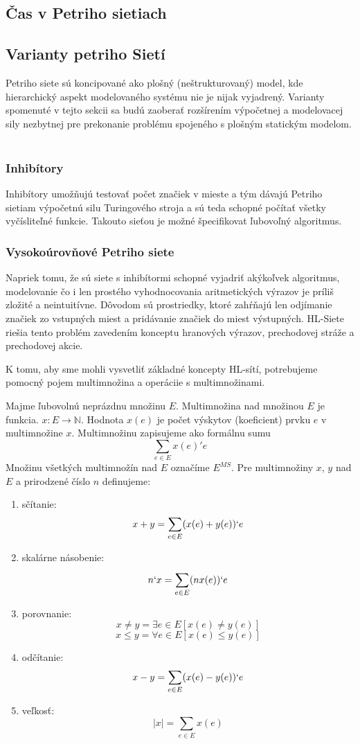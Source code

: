 \subsection{Čas v Petriho sietiach}

\subsection{Varianty petriho Sietí}
Petriho siete sú koncipované ako plošný (neštrukturovaný) model, kde hierarchický aspekt modelovaného systému nie je nijak vyjadrený. Varianty spomenuté v tejto sekcii sa budú zaoberať rozšírením výpočetnej a modelovacej sily nezbytnej pre prekonanie problému spojeného s plošným statickým modelom. \\\\
\subsubsection{Inhibítory}
Inhibítory umožňujú testovať počet značiek v mieste a tým dávajú Petriho sietiam výpočetnú silu Turingového stroja a sú teda schopné počítať všetky vyčísliteľné funkcie. Takouto sieťou je možné špecifikovat ľubovoľný algoritmus.
\subsubsection{Vysokoúrovňové Petriho siete}
Napriek tomu, že sú siete s inhibítormi schopné vyjadriť akýkoľvek algoritmus, modelovanie čo i len prostého vyhodnocovania aritmetických výrazov je príliš zložité a neintuitívne. Dôvodom sú prostriedky, ktoré zahŕňajú len odjímanie značiek zo vstupných miest a pridávanie značiek do miest výstupných. HL-Siete riešia tento problém zavedením konceptu hranových výrazov, prechodovej stráže a prechodovej akcie.

K tomu, aby sme mohli vysvetliť základné koncepty HL-sítí, potrebujeme pomocný pojem multimnožina a operáciie s multimnožinami.
\begin{defn}
	Majme ľubovolnú neprázdnu množinu $E$. Multimnožina nad množinou $E$ je funkcia. $x : E \longrightarrow \mathbb{N}$. Hodnota $x(e)$ je počet výskytov (koeficient) prvku $e$ v multimnožine $x$. Multimnožinu zapisujeme ako formálnu sumu 
	$$ \sum_{e \in E} x(e)'e $$
	Množinu všetkých multimnožín nad $E$ označíme $E^{MS}$. Pre multimnožiny $x$, $y$ nad $E$ a prirodzené číslo $n$ definujeme:
	
	\begin{enumerate}
		\item sčítanie: $$x + y = \sum_{e \in E} (x(e) + y (e))`e$$
		\item skalárne násobenie: $$n`x = \sum_{e \in E}^{} (n x(e))`e$$
		\item porovnanie:
		$$ x \neq y = \exists e \in E [x(e) \neq y(e) ]$$
		$$ x \leq y = \forall e \in E [x(e) \leq y(e) ]$$
		\item odčítanie: $$x - y = \sum_{e \in E} (x(e) - y (e))`e$$
		\item veľkosť: $$|x| = \sum_{e \in E} x(e)$$
	\end{enumerate}
\end{defn}

